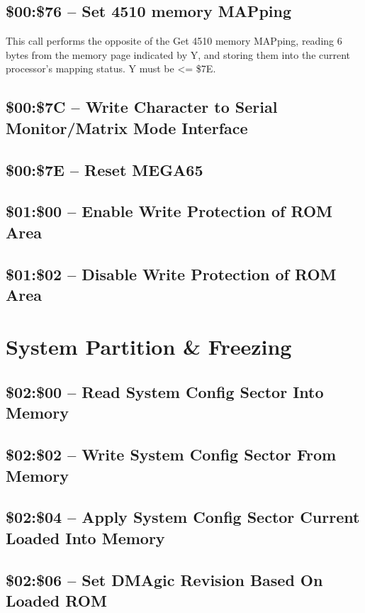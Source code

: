 \subsection{\$00:\$76 -- Set 4510 memory MAPping}

This call performs the opposite of the Get 4510 memory MAPping, reading 6 bytes
from the memory page indicated by Y, and storing them into the current processor's mapping status.
Y must be <= \$7E.

\subsection{\$00:\$7C -- Write Character to Serial Monitor/Matrix Mode Interface}
\subsection{\$00:\$7E -- Reset MEGA65}

\subsection{\$01:\$00 -- Enable Write Protection of ROM Area}
\subsection{\$01:\$02 -- Disable Write Protection of ROM Area}

\section{System Partition \& Freezing}

\subsection{\$02:\$00 -- Read System Config Sector Into Memory}
\subsection{\$02:\$02 -- Write System Config Sector From Memory}
\subsection{\$02:\$04 -- Apply System Config Sector Current Loaded Into Memory}
\subsection{\$02:\$06 -- Set DMAgic Revision Based On Loaded ROM}

